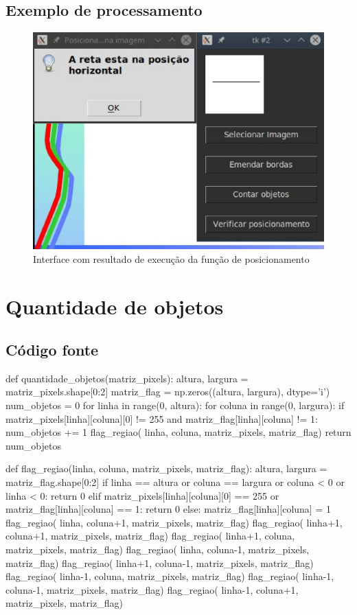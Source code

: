 \documentclass[a4paper,12pt]{article}
\begin{document}
\subsection{Exemplo de processamento}
\begin{figure}[h!]
    \includegraphics[scale=0.80]{cap_1.eps}
  \caption{Interface com resultado de execução da função de posicionamento}
\end{figure}

\pagebreak

\section{Quantidade de objetos}
\subsection{Código fonte}
\begin{python}
def quantidade_objetos(matriz_pixels):
    altura, largura = matriz_pixels.shape[0:2]
    matriz_flag = np.zeros((altura, largura), dtype='i')
    num_objetos = 0
    for linha in range(0, altura):
        for coluna in range(0, largura):
          if matriz_pixels[linha][coluna][0] != 255 and
           matriz_flag[linha][coluna] != 1:
              num_objetos += 1
              flag_regiao( linha, coluna, matriz_pixels, matriz_flag)
    return num_objetos

def flag_regiao(linha, coluna, matriz_pixels, matriz_flag):
    altura, largura = matriz_flag.shape[0:2]
    if linha == altura or coluna == largura or coluna < 0 or linha < 0:
        return 0
    elif matriz_pixels[linha][coluna][0] == 255 or matriz_flag[linha][coluna] == 1:
        return 0
    else:
        matriz_flag[linha][coluna] = 1
        flag_regiao( linha, coluna+1, matriz_pixels, matriz_flag)
        flag_regiao( linha+1, coluna+1, matriz_pixels, matriz_flag)
        flag_regiao( linha+1, coluna, matriz_pixels, matriz_flag)
        flag_regiao( linha, coluna-1, matriz_pixels, matriz_flag)
        flag_regiao( linha+1, coluna-1, matriz_pixels, matriz_flag)
        flag_regiao( linha-1, coluna, matriz_pixels, matriz_flag)
        flag_regiao( linha-1, coluna-1, matriz_pixels, matriz_flag)
        flag_regiao( linha-1, coluna+1, matriz_pixels, matriz_flag)
\end{python}
\end{document}
